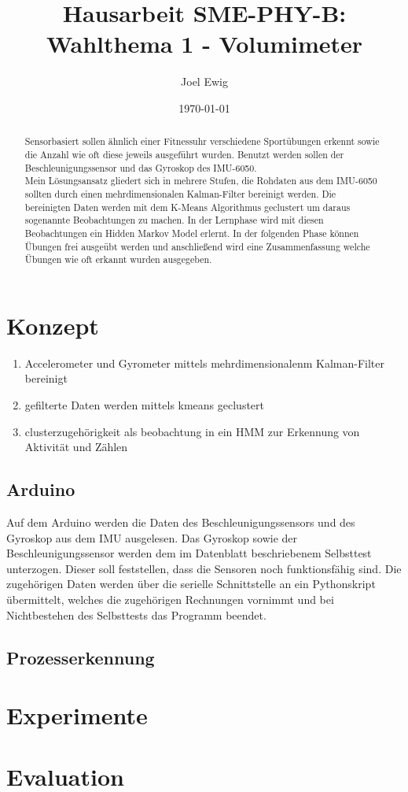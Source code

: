 \documentclass{article}
\begin{document}
\title{Hausarbeit SME-PHY-B: Wahlthema 1 - Volumimeter}
\author{Joel Ewig}
\date{\today}
\maketitle
\clearpage

\begin{abstract}
Sensorbasiert sollen ähnlich einer Fitnessuhr verschiedene Sportübungen erkennt sowie die Anzahl wie oft diese jeweils ausgeführt wurden.
Benutzt werden sollen der Beschleunigungssensor und das Gyroskop des IMU-6050.\\
Mein L\"osungsansatz gliedert sich in mehrere Stufen, die Rohdaten aus dem IMU-6050 sollten durch einen mehrdimensionalen Kalman-Filter bereinigt werden.
Die bereinigten Daten werden mit dem K-Means Algorithmus geclustert um daraus sogenannte \glqq{}Beobachtungen\grqq{} zu machen.
In der Lernphase wird mit diesen Beobachtungen ein Hidden Markov Model erlernt.
In der folgenden Phase k\"onnen \"Ubungen frei ausge\"ubt werden und anschließend wird eine Zusammenfassung welche \"Ubungen wie oft erkannt wurden ausgegeben.
\end{abstract}
\clearpage

\tableofcontents
\clearpage


\section{Konzept}
\begin{enumerate}
\item Accelerometer und Gyrometer mittels mehrdimensionalenm Kalman-Filter bereinigt
\item gefilterte Daten werden mittels kmeans geclustert
\item clusterzugeh\"origkeit als beobachtung in ein HMM zur Erkennung von Aktivit\"at und Z\"ahlen
\end{enumerate}
\subsection{Arduino}
Auf dem Arduino werden die Daten des Beschleunigungssensors und des Gyroskop aus dem IMU ausgelesen.
Das Gyroskop sowie der Beschleunigungssensor werden dem im Datenblatt beschriebenem Selbsttest unterzogen.
Dieser soll feststellen, dass die Sensoren noch funktionsf\"ahig sind.
Die zugeh\"origen Daten werden \"uber die serielle Schnittstelle an ein Pythonskript \"ubermittelt, welches die zugeh\"origen Rechnungen vornimmt und bei Nichtbestehen des Selbsttests das Programm beendet.\\

\subsection{Prozesserkennung}

\section{Experimente}
\section{Evaluation}
\end{document}
